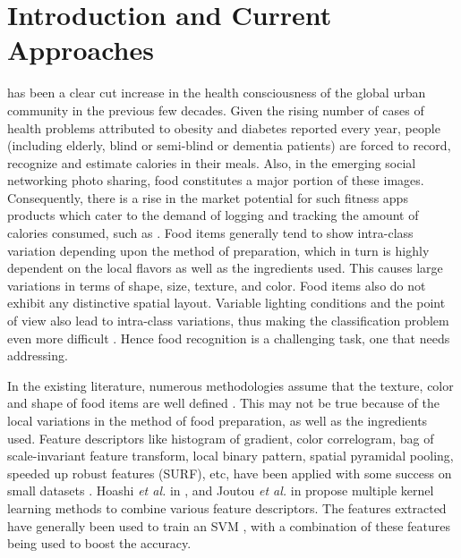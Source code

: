 \documentclass[journal]{IEEEtran}%
\begin{document}
\section{Introduction and Current Approaches}
 has been a clear cut increase in the health consciousness of the global urban community in the previous few decades. Given the rising number of cases of health problems attributed to obesity and diabetes reported every year, people (including elderly, blind or semi-blind or dementia patients) are forced to record, recognize and estimate calories in their meals. Also, in the emerging social networking photo sharing, food constitutes a major portion of these images. Consequently, there is a rise in the market potential for such fitness apps products which cater to the demand of logging and tracking the amount of calories consumed, such as \cite{MealSnap,Eatly}. Food items generally tend to show intra-class variation depending upon the method of preparation, which in turn is highly dependent on the local flavors as well as the ingredients used. This causes large variations in terms of shape, size, texture, and color. Food items also do not exhibit any distinctive spatial layout. Variable lighting conditions and the point of view also lead to intra-class variations, thus making the classification problem even more difficult \cite{Austin1,Mandal8,Mandal12}. Hence food recognition is a challenging task, one that needs addressing.

In the existing literature, numerous methodologies assume that the texture, color and shape of food items are well defined \cite{Sasano1,Pham1,Mandal10,Martinel1}. This may not be true because of the local variations in the method of food preparation, as well as the ingredients used. Feature descriptors like histogram of gradient, color correlogram, bag of scale-invariant feature transform, local binary pattern, spatial pyramidal pooling, speeded up robust features (SURF), etc, have been applied with some success on small datasets \cite{Martinel1}. Hoashi \emph{et al.} in \cite{Hoashi1}, and Joutou \emph{et al.} in \cite{Joutou1} propose multiple kernel learning methods to combine various feature descriptors. The features extracted have generally been used to train an SVM \cite{Cortes1}, with a combination of these features being used to boost the accuracy.
\end{document}
